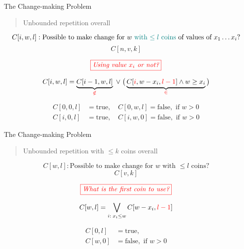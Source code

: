 \begin{frame}{}
  \begin{exampleblock}{The Change-making Problem}
    \begin{quote}
      \centering
      Unbounded repetition  overall
    \end{quote}
  \end{exampleblock}

  \pause
  \[
    C[i,w,l]: \text{Possible to make change for $w$ \textcolor{teal}{with $\le l$ coins} of values of $x_{1} \dots x_{i}$?}
  \]
  \[
    C[n,v,k]
  \]

  \pause
  \[
    \textcolor{red}{\fbox{\it Using value $x_{i}$ or not?}}
  \]

  \pause
  \[
    C[i,w,l] = \underbrace{C[i-1,w,l]}_{\textcolor{red}{\notin}} \;\lor\; 
    	\big(\underbrace{C[\textcolor{red}{i}, w-x_{i}, \textcolor{red}{l-1}] \land w \ge x_{i}}_{\textcolor{red}{\in}} \big)
  \]

  \pause
  \begin{align*}
    C[0,0,l] &= \text{true}, \quad C[0,w,l] = \text{false}, \text{ if } w > 0 \\
    C[i,0,l] &= \text{true}, \quad C[i,w,0] = \text{false}, \text{ if } w > 0
  \end{align*}
\end{frame}

\begin{frame}{}
  \begin{exampleblock}{The Change-making Problem}
    \begin{quote}
      \centering
      Unbounded repetition with $\le k$ coins overall
    \end{quote}
  \end{exampleblock}

  \pause
  \[
    C[w,l]: \text{Possible to make change for $w$ with $\le l$ coins?}
  \]
  \[
    C[v,k]
  \]

  \pause
  \[
    \textcolor{red}{\fbox{\it What is the first coin to use?}}
  \]
 
  \pause
  \[
    C[w,l] = \bigvee_{i: \; x_i \le w} C[w-x_i, \textcolor{red}{l-1}]
  \]

  \pause
  \begin{align*}
    C[0,l] &= \text{true}, \\
    C[w,0] &= \text{false}, \text{ if } w > 0
  \end{align*}
\end{frame}
